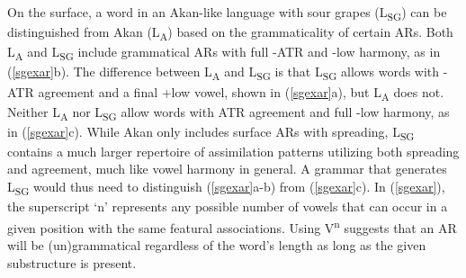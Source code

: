 \documentclass[,doc,floatsintext]{apa6}
\theoremstyle{definition}
\theoremstyle{definition}
\theoremstyle{definition}
\theoremstyle{remark}
\begin{document}
On the surface, a word in an Akan-like language with sour grapes
(L\textsubscript{SG}) can be distinguished from Akan
(L\textsubscript{A}) based on the grammaticality of certain ARs. Both
L\textsubscript{A} and L\textsubscript{SG} include grammatical ARs with
full -ATR and -low harmony, as in (\ref{sgexar}b). The difference
between L\textsubscript{A} and L\textsubscript{SG} is that
L\textsubscript{SG} allows words with -ATR agreement and a final +low
vowel, shown in (\ref{sgexar}a), but L\textsubscript{A} does not.
Neither L\textsubscript{A} nor L\textsubscript{SG} allow words with ATR
agreement and full -low harmony, as in (\ref{sgexar}c). While Akan only
includes surface ARs with spreading, L\textsubscript{SG} contains a much
larger repertoire of assimilation patterns utilizing both spreading and
agreement, much like vowel harmony in general. A grammar that generates
L\textsubscript{SG} would thus need to distinguish (\ref{sgexar}a-b)
from (\ref{sgexar}c). In (\ref{sgexar}), the superscript `n' represents
any possible number of vowels that can occur in a given position with
the same featural associations. Using V\textsuperscript{n} suggests that
an AR will be (un)grammatical regardless of the word's length as long as
the given substructure is present. \newpage
\end{document}
